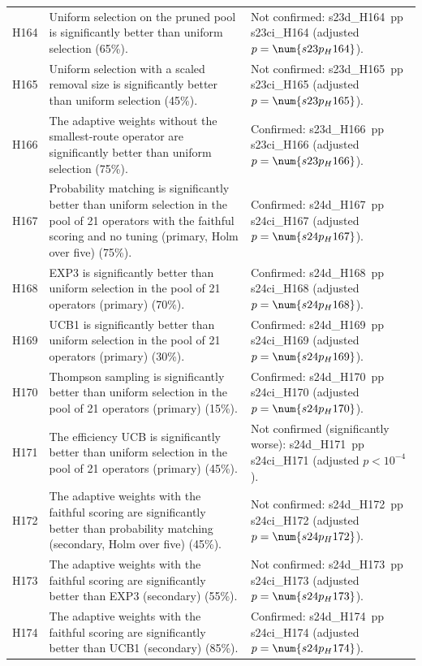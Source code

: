 \begin{center}
\begin{longtable}{>{\raggedright\arraybackslash}p{0.9cm}>{\raggedright\arraybackslash}p{5.2cm}>{\raggedright\arraybackslash}p{8.5cm}}
H164 & Uniform selection on the pruned pool is significantly better than uniform selection (65\%). & Not confirmed: \num{s23d_H164}~pp \num{s23ci_H164} (adjusted $p=\num{s23p_H164}$). \\
H165 & Uniform selection with a scaled removal size is significantly better than uniform selection (45\%). & Not confirmed: \num{s23d_H165}~pp \num{s23ci_H165} (adjusted $p=\num{s23p_H165}$). \\
H166 & The adaptive weights without the smallest-route operator are significantly better than uniform selection (75\%). & Confirmed: \num{s23d_H166}~pp \num{s23ci_H166} (adjusted $p=\num{s23p_H166}$). \\
H167 & Probability matching is significantly better than uniform selection in the pool of 21 operators with the faithful scoring and no tuning (primary, Holm over five) (75\%). & Confirmed: \num{s24d_H167}~pp \num{s24ci_H167} (adjusted $p=\num{s24p_H167}$). \\
H168 & EXP3 is significantly better than uniform selection in the pool of 21 operators (primary) (70\%). & Confirmed: \num{s24d_H168}~pp \num{s24ci_H168} (adjusted $p=\num{s24p_H168}$). \\
H169 & UCB1 is significantly better than uniform selection in the pool of 21 operators (primary) (30\%). & Confirmed: \num{s24d_H169}~pp \num{s24ci_H169} (adjusted $p=\num{s24p_H169}$). \\
H170 & Thompson sampling is significantly better than uniform selection in the pool of 21 operators (primary) (15\%). & Confirmed: \num{s24d_H170}~pp \num{s24ci_H170} (adjusted $p=\num{s24p_H170}$). \\
H171 & The efficiency UCB is significantly better than uniform selection in the pool of 21 operators (primary) (45\%). & Not confirmed (significantly worse): \num{s24d_H171}~pp \num{s24ci_H171} (adjusted $p<10^{-4}$). \\
H172 & The adaptive weights with the faithful scoring are significantly better than probability matching (secondary, Holm over five) (45\%). & Not confirmed: \num{s24d_H172}~pp \num{s24ci_H172} (adjusted $p=\num{s24p_H172}$). \\
H173 & The adaptive weights with the faithful scoring are significantly better than EXP3 (secondary) (55\%). & Not confirmed: \num{s24d_H173}~pp \num{s24ci_H173} (adjusted $p=\num{s24p_H173}$). \\
H174 & The adaptive weights with the faithful scoring are significantly better than UCB1 (secondary) (85\%). & Confirmed: \num{s24d_H174}~pp \num{s24ci_H174} (adjusted $p=\num{s24p_H174}$). \\

\end{longtable}
\end{center}
